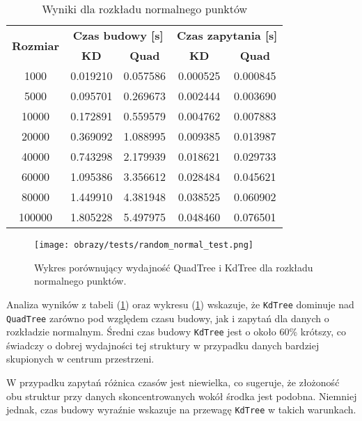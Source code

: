 \documentclass[12pt]{article}
\begin{document}
\begin{table}[h]
\centering
\caption{Wyniki dla rozkładu normalnego punktów}
\label{tab:random_normal_test}
\begin{tabular}{ccccc}
\toprule
\multirow{2}{*}{\textbf{Rozmiar}} & \multicolumn{2}{c}{\textbf{Czas budowy [s]}} & \multicolumn{2}{c}{\textbf{Czas zapytania [s]}} \\
\cmidrule(lr){2-3} \cmidrule(lr){4-5}
 & \textbf{KD} & \textbf{Quad} & \textbf{KD} & \textbf{Quad} \\
\midrule
1000   & 0.019210 & 0.057586 & 0.000525 & 0.000845 \\
5000   & 0.095701 & 0.269673 & 0.002444 & 0.003690 \\
10000  & 0.172891 & 0.559579 & 0.004762 & 0.007883 \\
20000  & 0.369092 & 1.088995 & 0.009385 & 0.013987 \\
40000  & 0.743298 & 2.179939 & 0.018621 & 0.029733 \\
60000  & 1.095386 & 3.356612 & 0.028484 & 0.045621 \\
80000  & 1.449910 & 4.381948 & 0.038525 & 0.060902 \\
100000 & 1.805228 & 5.497975 & 0.048460 & 0.076501 \\
\bottomrule
\end{tabular}
\end{table}

\begin{figure}[h]
    \centering
    \texttt{[image: obrazy/tests/random\_normal\_test.png]}
    \caption{Wykres porównujący wydajność QuadTree i KdTree dla rozkładu normalnego punktów.}
    \label{fig:random_normal_tests}
\end{figure}


\newpage
\noindent Analiza wyników z tabeli (\ref{tab:random_normal_test}) oraz wykresu (\ref{fig:random_normal_tests}) wskazuje, że \texttt{KdTree} dominuje nad \texttt{QuadTree} zarówno pod względem czasu budowy, jak i zapytań dla danych o rozkładzie normalnym. Średni czas budowy \texttt{KdTree} jest o około 60\% krótszy, co świadczy o dobrej wydajności tej struktury w przypadku danych bardziej skupionych w centrum przestrzeni.

\noindent W przypadku zapytań różnica czasów jest niewielka, co sugeruje, że złożoność obu struktur przy danych skoncentrowanych wokół środka jest podobna. Niemniej jednak, czas budowy wyraźnie wskazuje na przewagę \texttt{KdTree} w takich warunkach.

\newpage
\end{document}
